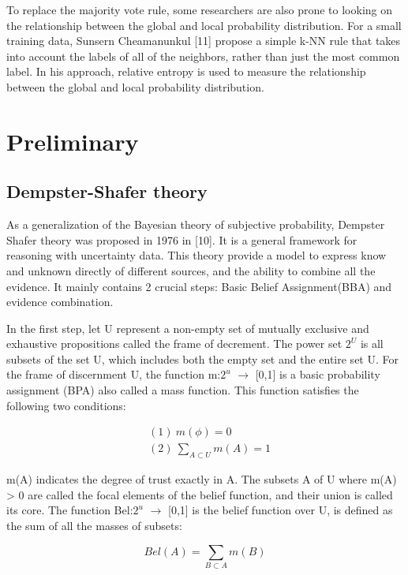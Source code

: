 \documentclass[runningheads]{llncs}
\begin{document}
To replace the majority vote rule, some researchers are also prone to looking on the relationship between the global  and local probability distribution. For a small training data, Sunsern Cheamanunkul [11] propose a simple k-NN rule that takes into account the labels of all of the neighbors, rather than just the most common label. In his approach, relative entropy is used to measure the relationship between the global  and local probability distribution.

\section{Preliminary}
\subsection{Dempster-Shafer theory}
As a generalization of the Bayesian theory of subjective probability, Dempster Shafer theory was proposed in 1976 in [10]. It is a general framework for reasoning with uncertainty data. This theory provide a model to express know and unknown directly of different sources, and the ability to combine all the evidence. It mainly contains 2 crucial steps: Basic Belief Assignment(BBA) and evidence combination.

In the first step, let U represent a non-empty set of mutually exclusive and exhaustive propositions called the frame of decrement. The power set $2^{U}$ is all subsets of the set U, which includes both the empty set  and the entire set U. For the frame of discernment U, the function m:$2^{u}$ $\rightarrow$ [0,1] is a basic probability assignment (BPA) also called a mass function. This function satisfies the following two conditions:

\begin{equation}
\begin{split}
&(1)\ m(\phi) = 0\\&(2)\ \sum_{A\subset U}m(A) = 1
\end{split}
\end{equation}

m(A) indicates the degree of trust exactly in A. The subsets A of U where m(A) > 0 are called the focal elements of the belief function, and their union is called its core. The function Bel:$2^{u}$ $\rightarrow$ [0,1] is the belief function over U, is defined as the sum of all the masses of subsets:

\begin{equation}
Bel(A) = \sum_{B\subset A}m(B)
\end{equation}
\end{document}
